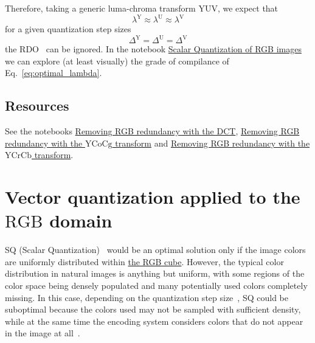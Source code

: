 Therefore, taking a generic luma-chroma transform $\text{YUV}$, we
expect that
\begin{equation}
  \lambda^{\text{Y}} \approx \lambda^{\text{U}} \approx \lambda^{\text{V}}
  \label{eq:optimal_lambda}
\end{equation}
for a given quantization step sizes
\begin{equation}
  \Delta^{\text{Y}} = \Delta^{\text{U}} = \Delta^{\text{V}}
  \label{eq:optimal_lambda}
\end{equation}
the RDO~\cite{vruiz__information_theory} can be ignored. In the
notebook
\href{https://github.com/Sistemas-Multimedia/Sistemas-Multimedia.github.io/blob/master/contents/RGB_SQ/RGB_SQ.ipynb}{Scalar
  Quantization of RGB images} we can explore (at least visually) the
grade of compilance of Eq.~\eqref{eq:optimal_lambda}.

\subsection*{Resources}
See the notebooks
\href{https://github.com/vicente-gonzalez-ruiz/color_transforms/blob/main/docs/3DCT/3DCT_over_RGB.ipynb}{Removing
  RGB redundancy with the DCT},
\href{https://github.com/vicente-gonzalez-ruiz/color_transforms/blob/main/docs/YCoCg/YCoCg_over_RGB.ipynb}{Removing
  RGB redundancy with the $\text{YCoCg}$ transform} and
\href{https://github.com/vicente-gonzalez-ruiz/color_transforms/blob/main/docs/YCrCb/YCrCb_over_RGB.ipynb}{Removing
  RGB redundancy with the $\text{YCrCb}$ transform}.

\section{Vector quantization applied to the $\text{RGB}$ domain}

SQ (Scalar
Quantization)~\cite{vruiz__scalar_quantization,sayood2017introduction}
would be an optimal solution only if the image colors are uniformly
distributed within
\href{https://en.wikipedia.org/wiki/RGB_color_model}{the RGB
  cube}. However, the typical color distribution in natural images is
anything but uniform, with some regions of the color space being
densely populated and many potentially used colors completely
missing. In this case, depending on the quantization step
size~\cite{vruiz__signal_quantization}, SQ could be suboptimal because
the colors used may not be sampled with sufficient density, while at the
same time the encoding system considers colors that do not appear
in the image at all~\cite{burger2016digital}.

